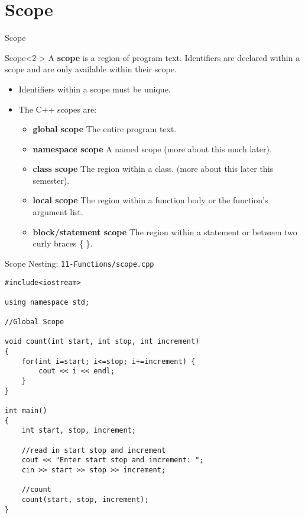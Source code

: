 \documentclass[]{beamer}
\begin{document}
\section{Scope}
\begin{frame}{Scope}
    \begin{block}{Scope}<2->
        A \textbf{scope} is a region of program text.  Identifiers are
        declared within a scope and are only available within their
        scope.
    \end{block}
    \begin{itemize}[<+(2)->]
        \item Identifiers within a scope must be unique.
        \item The C++ scopes are:
        \begin{itemize}
            \item \textbf{global scope} The entire program text.
            \item \textbf{namespace scope} A named scope (more about
                this much later).
            \item \textbf{class scope} The region within a class.
                (more about this later this semester).
            \item \textbf{local scope} The region within a function
                body or the function's argument list.
            \item \textbf{block/statement scope} The region within
                a statement or between two curly braces \{ \}.
        \end{itemize}
    \end{itemize}
\end{frame}

\begin{frame}[fragile]{Scope Nesting: \texttt{11-Functions/scope.cpp}}
\begin{adjustbox}{max totalheight=0.9\textheight, max width=0.95\textwidth}
\begin{BVerbatim}
#include<iostream>

using namespace std;

//Global Scope

void count(int start, int stop, int increment)
{
    for(int i=start; i<=stop; i+=increment) {
        cout << i << endl;
    }
}

int main()
{
    int start, stop, increment;

    //read in start stop and increment
    cout << "Enter start stop and increment: ";
    cin >> start >> stop >> increment;

    //count
    count(start, stop, increment);
}
\end{BVerbatim}
\end{adjustbox}
\end{frame}
\end{document}
